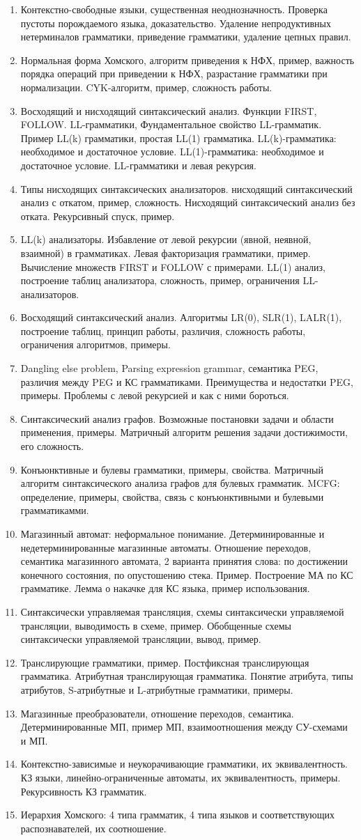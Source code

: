\documentclass[12pt]{article}
\newcommand{\litem}[1]{\item #1 }%
\begin{document}
\begin{enumerate}
  \litem {Контекстно-свободные языки, существенная неоднозначность. Проверка пустоты порождаемого языка, доказательство. Удаление непродуктивных нетерминалов грамматики, приведение грамматики, удаление цепных правил. }
  \litem {Нормальная форма Хомского, алгоритм приведения к НФХ, пример, важность порядка операций при приведении к НФХ, разрастание грамматики при нормализации. CYK-алгоритм, пример, сложность работы. }
  \litem {Восходящий и нисходящий синтаксический анализ. Функции FIRST, FOLLOW. LL-грамматики, Фундаментальное свойство LL-грамматик. Пример LL(k) грамматики, простая LL(1) грамматика. LL(k)-грамматика: необходимое и достаточное условие. LL(1)-грамматика: необходимое и достаточное условие. LL-грамматики и левая рекурсия.}
  \litem {Типы нисходящих синтаксических анализаторов. нисходящий синтаксический анализ с откатом, пример, сложность. Нисходящий синтаксический анализ без отката. Рекурсивный спуск, пример. }
  \litem {LL(k) анализаторы. Избавление от левой рекурсии (явной, неявной, взаимной) в грамматиках. Левая факторизация грамматики, пример. Вычисление множеств FIRST и FOLLOW с примерами. LL(1) анализ, построение таблиц анализатора, сложность, пример, ограничения LL-анализаторов. }
  \litem {Восходящий синтаксический анализ. Алгоритмы LR(0), SLR(1), LALR(1), построение таблиц, принцип работы, различия, сложность работы, ограничения алгоритмов, примеры.}
  \litem {Dangling else problem, Parsing expression grammar, семантика PEG, различия между PEG и КС грамматиками. Преимущества и недостатки PEG, примеры. Проблемы с левой рекурсией и как с ними бороться. }
  \litem {Синтаксический анализ графов. Возможные постановки задачи и области применения, примеры. Матричный алгоритм решения задачи достижимости, его сложность. }
  \litem {Конъюнктивные и булевы грамматики, примеры, свойства. Матричный алгоритм синтаксического анализа графов для булевых грамматик. MCFG: определение, примеры, свойства, связь с конъюнктивными и булевыми грамматикамми.}
  \litem {Магазинный автомат: неформальное понимание. Детерминированные и недетерминированные магазинные автоматы. Отношение переходов, семантика магазинного автомата, 2 варианта принятия слова: по достижении конечного состояния, по опустошению стека. Пример. Построение МА по КС грамматике. Лемма о накачке для КС языка, пример использования. }
  \litem {Синтаксически управляемая трансляция, схемы синтаксически управляемой трансляции, выводимость в схеме, пример. Обобщенные схемы синтаксически управляемой трансляции, вывод, пример. }
  \litem {Транслирующие грамматики, пример. Постфиксная транслирующая грамматика. Атрибутная транслирующая грамматика. Понятие атрибута, типы атрибутов, S-атрибутные и L-атрибутные грамматики, примеры. }
  \litem {Магазинные преобразователи, отношение переходов, семантика. Детерминированные МП, пример МП, взаимоотношения между СУ-схемами и МП.}
  \litem {Контекстно-зависимые и неукорачивающие грамматики, их эквивалентность. КЗ языки, линейно-ограниченные автоматы, их эквивалентность, примеры. Рекурсивность КЗ грамматик. }
  \litem {Иерархия Хомского: 4 типа грамматик, 4 типа языков и соответствующих распознавателей, их соотношение.}
\end{enumerate}
\end{document}
